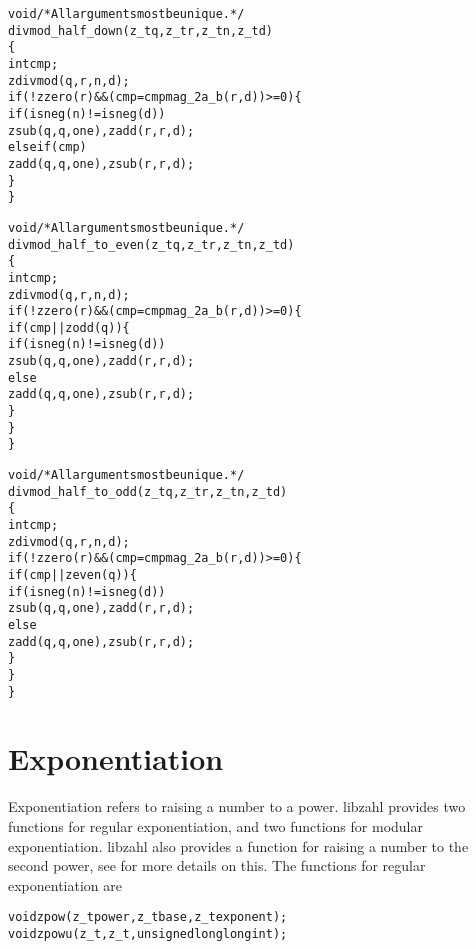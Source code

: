 \begin{alltt}
   void \textcolor{c}{/* \textrm{All arguments most be unique.} */}
   divmod_half_down(z_t q, z_t r, z_t n, z_t d)
   \{
       int cmp;
       zdivmod(q, r, n, d);
       if (!zzero(r) && (cmp = cmpmag_2a_b(r, d)) >= 0) \{
           if (isneg(n) != isneg(d))
               zsub(q, q, one), zadd(r, r, d);
           else if (cmp)
               zadd(q, q, one), zsub(r, r, d);
       \}
   \}
\end{alltt}

\begin{alltt}
   void \textcolor{c}{/* \textrm{All arguments most be unique.} */}
   divmod_half_to_even(z_t q, z_t r, z_t n, z_t d)
   \{
       int cmp;
       zdivmod(q, r, n, d);
       if (!zzero(r) && (cmp = cmpmag_2a_b(r, d)) >= 0) \{
           if (cmp || zodd(q)) \{
               if (isneg(n) != isneg(d))
                   zsub(q, q, one), zadd(r, r, d);
               else
                   zadd(q, q, one), zsub(r, r, d);
           \}
       \}
   \}
\end{alltt}

\newpage
\begin{alltt}
   void \textcolor{c}{/* \textrm{All arguments most be unique.} */}
   divmod_half_to_odd(z_t q, z_t r, z_t n, z_t d)
   \{
       int cmp;
       zdivmod(q, r, n, d);
       if (!zzero(r) && (cmp = cmpmag_2a_b(r, d)) >= 0) \{
           if (cmp || zeven(q)) \{
               if (isneg(n) != isneg(d))
                   zsub(q, q, one), zadd(r, r, d);
               else
                   zadd(q, q, one), zsub(r, r, d);
           \}
       \}
   \}
\end{alltt}




\newpage
\section{Exponentiation}
\label{sec:Exponentiation}

Exponentiation refers to raising a number to
a power. libzahl provides two functions for
regular exponentiation, and two functions for
modular exponentiation. libzahl also provides
a function for raising a number to the second
power, see  for
more details on this. The functions for regular
exponentiation are

\begin{alltt}
   void zpow(z_t power, z_t base, z_t exponent);
   void zpowu(z_t, z_t, unsigned long long int);
\end{alltt}

